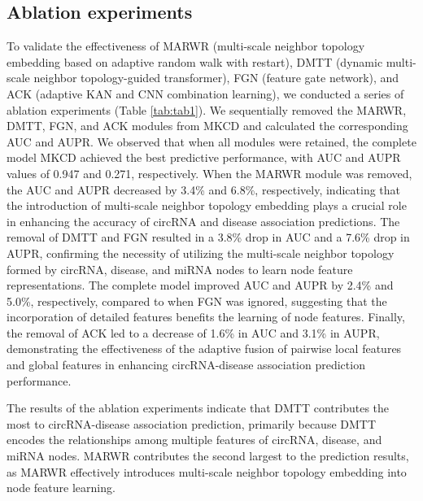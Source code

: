 \documentclass{bioinfo}
\begin{document}
\begin{methods}
\vspace{0.3cm}


\subsection{Ablation experiments}
To validate the effectiveness of MARWR (multi-scale neighbor topology embedding based on adaptive random walk with restart), DMTT (dynamic multi-scale neighbor topology-guided transformer), FGN (feature gate network), and ACK (adaptive KAN and CNN combination learning), we conducted a series of ablation experiments (Table \ref{tab:tab1}). We sequentially removed the MARWR, DMTT, FGN, and ACK modules from MKCD and calculated the corresponding AUC and AUPR. We observed that when all modules were retained, the complete model MKCD achieved the best predictive performance, with AUC and AUPR values of 0.947 and 0.271, respectively. When the MARWR module was removed, the AUC and AUPR decreased by 3.4\% and 6.8\%, respectively, indicating that the introduction of multi-scale neighbor topology embedding plays a crucial role in enhancing the accuracy of circRNA and disease association predictions. The removal of DMTT and FGN resulted in a 3.8\% drop in AUC and a 7.6\% drop in AUPR, confirming the necessity of utilizing the multi-scale neighbor topology formed by circRNA, disease, and miRNA nodes to learn node feature representations. The complete model improved AUC and AUPR by 2.4\% and 5.0\%, respectively, compared to when FGN was ignored, suggesting that the incorporation of detailed features benefits the learning of node features. Finally, the removal of ACK led to a decrease of 1.6\% in AUC and 3.1\% in AUPR, demonstrating the effectiveness of the adaptive fusion of pairwise local features and global features in enhancing circRNA-disease association prediction performance.

The results of the ablation experiments indicate that DMTT contributes the most to circRNA-disease association prediction, primarily because DMTT encodes the relationships among multiple features of circRNA, disease, and miRNA nodes. MARWR contributes the second largest to the prediction results, as MARWR effectively introduces multi-scale neighbor topology embedding into node feature learning.


\end{methods}
\end{document}
